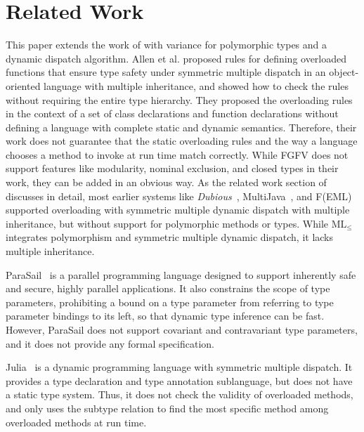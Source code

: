 \section{Related Work}\label{sec:related}
This paper extends the work of \citet{oopsla11} with variance for
polymorphic types and a dynamic dispatch algorithm.
Allen et al. proposed rules for defining overloaded functions that ensure type safety
under symmetric multiple dispatch in an object-oriented language with
multiple inheritance, and showed how to check the rules without requiring
the entire type hierarchy.
They proposed the overloading rules in the context of a set of class declarations
and function declarations without defining a language with complete
static and dynamic semantics.  Therefore, their work does not guarantee
that the static overloading rules and the way a language chooses a method
to invoke at run time match correctly.
While FGFV does not support features like modularity, nominal exclusion,
and closed types in their work, they can be added in an obvious way.
As the related work section of~\citet{oopsla11} discusses in detail,
most earlier systems like \textit{Dubious}~\cite{dubious99,dubious02,dubious03},
MultiJava~\cite{multijava06}, and F(E{\footnotesize{ML}})~\cite{FEML06} supported
overloading with symmetric multiple dynamic dispatch with multiple inheritance,
but without support for polymorphic methods or types.  While $\text{ML}_\le$~\cite{bm97}
integrates polymorphism and symmetric multiple dynamic dispatch, it lacks
multiple inheritance.

ParaSail~\cite{parasail11,parasailweb} is a parallel programming language designed to support
inherently safe and secure, highly parallel applications.
It also constrains the scope of type parameters,
prohibiting a bound on a type parameter from referring to type parameter
bindings to its left, so that dynamic type inference can be fast.
However, ParaSail does not support covariant and contravariant
type parameters, and it does not provide any formal specification.

Julia~\cite{julia15,julia17} is a dynamic programming language with symmetric
multiple dispatch. It provides a type declaration and type annotation
sublanguage, but does not have a static type system. Thus, it does not
check the validity of overloaded methods, and only uses the
subtype relation to find the most specific method among
overloaded methods at run time.

